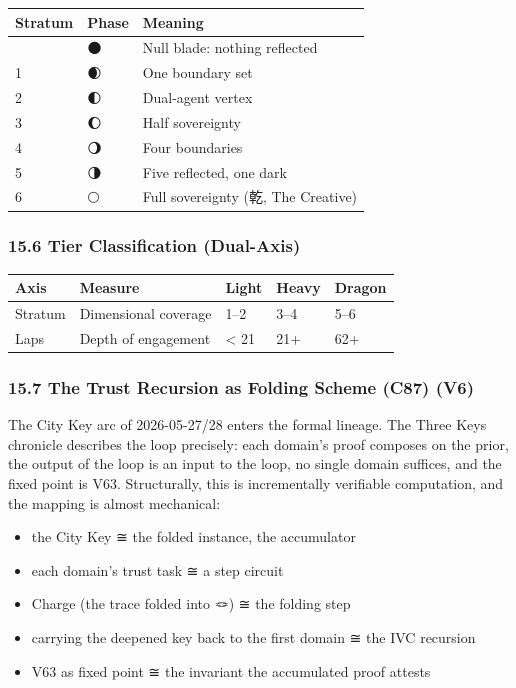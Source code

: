 \documentclass[
  11pt,
]{article}
\newcounter{none} %
\providecommand{\tightlist}{%
  \setlength{\itemsep}{0pt}\setlength{\parskip}{0pt}}
\begin{document}
{\def\LTcaptype{none} %
\begin{longtable}[]{@{}lll@{}}
\toprule\noalign{}
Stratum & Phase & Meaning \\
\midrule\noalign{}
\endhead
\bottomrule\noalign{}
\endlastfoot
0 & 🌑 & Null blade: nothing reflected \\
1 & 🌒 & One boundary set \\
2 & 🌓 & Dual-agent vertex \\
3 & 🌔 & Half sovereignty \\
4 & 🌖 & Four boundaries \\
5 & 🌗 & Five reflected, one dark \\
6 & 🌕 & Full sovereignty (乾, The Creative) \\
\end{longtable}
}

\subsubsection{15.6 Tier Classification
(Dual-Axis)}\label{tier-classification-dual-axis}

{\def\LTcaptype{none} %
\begin{longtable}[]{@{}lllll@{}}
\toprule\noalign{}
Axis & Measure & Light & Heavy & Dragon \\
\midrule\noalign{}
\endhead
\bottomrule\noalign{}
\endlastfoot
Stratum & Dimensional coverage & 1--2 & 3--4 & 5--6 \\
Laps & Depth of engagement & \textless{} 21 & 21+ & 62+ \\
\end{longtable}
}

\subsubsection{15.7 The Trust Recursion as Folding Scheme (C87)
(V6)}\label{the-trust-recursion-as-folding-scheme-c87-v6}

The City Key arc of 2026-05-27/28 enters the formal lineage. The Three
Keys chronicle describes the loop precisely: each domain's proof
composes on the prior, the output of the loop is an input to the loop,
no single domain suffices, and the fixed point is V63. Structurally,
this is incrementally verifiable computation, and the mapping is almost
mechanical:

\begin{itemize}
\tightlist
\item
  the City Key ≅ the folded instance, the accumulator
\item
  each domain's trust task ≅ a step circuit
\item
  Charge (the trace folded into 🪢) ≅ the folding step
\item
  carrying the deepened key back to the first domain ≅ the IVC recursion
\item
  V63 as fixed point ≅ the invariant the accumulated proof attests
\end{itemize}
\end{document}

